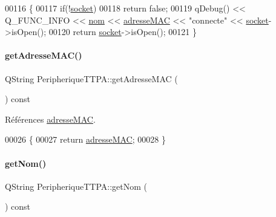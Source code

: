\begin{DoxyCode}
00116 \{    
00117     \textcolor{keywordflow}{if}(!\hyperlink{class_peripherique_t_t_p_a_ab66f30984a7f9fa17fd28391efe968a9}{socket})
00118         \textcolor{keywordflow}{return} \textcolor{keyword}{false};
00119     qDebug() << Q\_FUNC\_INFO << \hyperlink{class_peripherique_t_t_p_a_afafe3566b4b5357819811218b9a4244f}{nom} << \hyperlink{class_peripherique_t_t_p_a_a444063230c83cf81eff8a3a55736f2cf}{adresseMAC} << \textcolor{stringliteral}{"connecte"} << 
      \hyperlink{class_peripherique_t_t_p_a_ab66f30984a7f9fa17fd28391efe968a9}{socket}->isOpen();
00120     \textcolor{keywordflow}{return} \hyperlink{class_peripherique_t_t_p_a_ab66f30984a7f9fa17fd28391efe968a9}{socket}->isOpen();
00121 \}
\end{DoxyCode}
\mbox{\label{class_peripherique_t_t_p_a_a1e828514b4576a87295bb2d9a3d87876}} 
\paragraph{\texorpdfstring{get\+Adresse\+M\+A\+C()}{getAdresseMAC()}}
{\footnotesize\ttfamily Q\+String Peripherique\+T\+T\+P\+A\+::get\+Adresse\+M\+AC (\begin{DoxyParamCaption}{ }\end{DoxyParamCaption}) const}



Références \hyperlink{class_peripherique_t_t_p_a_a444063230c83cf81eff8a3a55736f2cf}{adresse\+M\+AC}.


\begin{DoxyCode}
00026 \{
00027     \textcolor{keywordflow}{return} \hyperlink{class_peripherique_t_t_p_a_a444063230c83cf81eff8a3a55736f2cf}{adresseMAC};
00028 \}
\end{DoxyCode}
\mbox{\label{class_peripherique_t_t_p_a_abb04680791a7e778ac3808b5d218421f}} 
\paragraph{\texorpdfstring{get\+Nom()}{getNom()}}
{\footnotesize\ttfamily Q\+String Peripherique\+T\+T\+P\+A\+::get\+Nom (\begin{DoxyParamCaption}{ }\end{DoxyParamCaption}) const}



